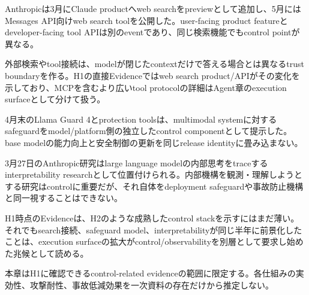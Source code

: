 
Anthropicは3月にClaude productへweb searchをpreviewとして追加し、5月にはMessages API向けweb search toolを公開した。user-facing product featureとdeveloper-facing tool APIは別のeventであり、同じ検索機能でもcontrol pointが異なる。\autocite{src-6e15bd50b7db,src-e31c642d34b6}


外部検索やtool接続は、modelが閉じたcontextだけで答える場合とは異なるtrust boundaryを作る。H1の直接Evidenceではweb search product/APIがその変化を示しており、MCPを含むより広いtool protocolの詳細はAgent章のexecution surfaceとして分けて扱う。\autocite{src-6e15bd50b7db,src-e31c642d34b6}


4月末のLlama Guard 4とprotection toolsは、multimodal systemに対するsafeguardをmodel/platform側の独立したcontrol componentとして提示した。base modelの能力向上と安全制御の更新を同じrelease identityに畳み込まない。\autocite{src-383476bdf62e}


3月27日のAnthropic研究はlarge language modelの内部思考をtraceするinterpretability researchとして位置付けられる。内部機構を観測・理解しようとする研究はcontrolに重要だが、それ自体をdeployment safeguardや事故防止機構と同一視することはできない。\autocite{src-fdc10e3226e6}


H1時点のEvidenceは、H2のような成熟したcontrol stackを示すにはまだ薄い。それでもsearch接続、safeguard model、interpretabilityが同じ半年に前景化したことは、execution surfaceの拡大がcontrol/observabilityを別層として要求し始めた兆候として読める。\autocite{src-383476bdf62e,src-e31c642d34b6,src-fdc10e3226e6}


\begin{claimboundary}
本章はH1に確認できるcontrol-related evidenceの範囲に限定する。各仕組みの実効性、攻撃耐性、事故低減効果を一次資料の存在だけから推定しない。
\end{claimboundary}
